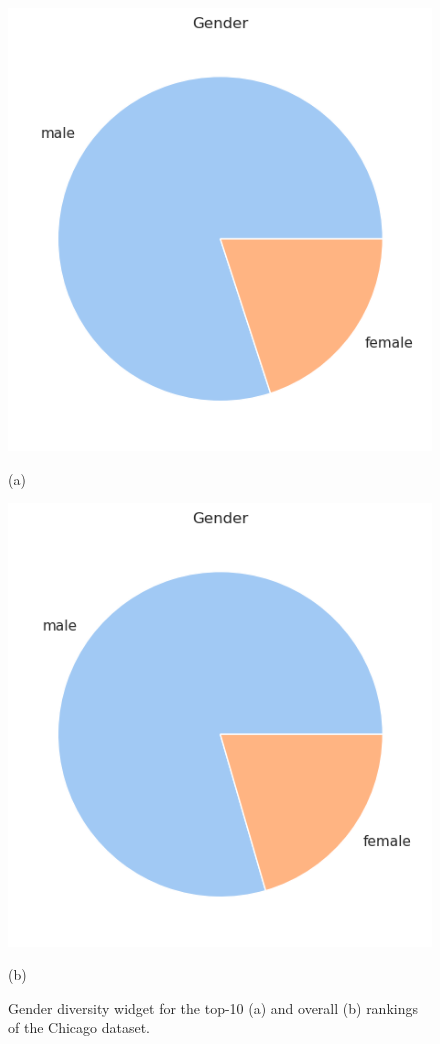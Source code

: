 \begin{itemize}
\begin{figure}[t!]
\centering
\begin{minipage}{0.45\textwidth}
\centering
\includegraphics[width=\textwidth]{figures/chicago_rankingfacts3a.png}
\caption*{(a)}
\end{minipage}
\begin{minipage}{0.45\textwidth}
\centering
\includegraphics[width=\textwidth]{figures/chicago_rankingfacts3b.png}
\caption*{(b)}
\end{minipage}
\caption{\textrm{Gender} diversity widget for the top-10 (a) and overall (b) rankings of the Chicago dataset.}
\label{fig:chicago_rankingfacts3}
\end{figure}

\end{itemize}
